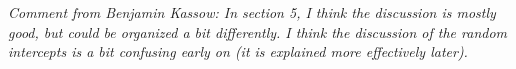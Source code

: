 \documentclass[headsepline=true, abstracton]{scrartcl}
\begin{document}
\textit{Comment from Benjamin Kassow: In section 5, I think the discussion is mostly good, but could be organized a bit differently. 
I think the discussion of the random intercepts is a bit confusing early on (it is explained more effectively later). }




\end{document}
